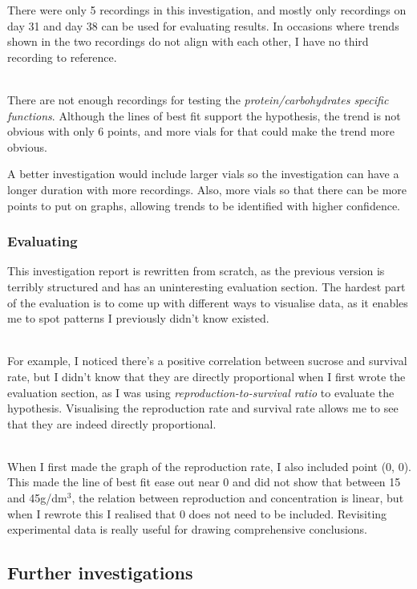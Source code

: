 \documentclass{article}
\begin{document}
There were only 5 recordings in this investigation, and mostly only recordings on day 31 and day 38 can be used for evaluating results. In occasions where trends shown in the two recordings do not align with each other, I have no third recording to reference.

\noindent\\
There are not enough recordings for testing the \emph{protein/carbohydrates specific functions}. Although the lines of best fit support the hypothesis, the trend is not obvious with only 6 points, and more vials for that could make the trend more obvious.

\newpage
\noindent
A better investigation would include larger vials so the investigation can have a longer duration with more recordings. Also, more vials so that there can be more points to put on graphs, allowing trends to be identified with higher confidence.

\subsubsection{Evaluating}

This investigation report is rewritten from scratch, as the previous version is terribly structured and has an uninteresting evaluation section. The hardest part of the evaluation is to come up with different ways to visualise data, as it enables me to spot patterns I previously didn't know existed.

\noindent\\
For example, I noticed there's a positive correlation between sucrose and survival rate, but I didn't know that they are directly proportional when I first wrote the evaluation section, as I was using \emph{reproduction-to-survival ratio} to evaluate the hypothesis. Visualising the reproduction rate and survival rate allows me to see that they are indeed directly proportional.

\noindent\\
When I first made the graph of the reproduction rate, I also included point (0, 0). This made the line of best fit ease out near 0 and did not show that between 15 and 45g/dm$^3$, the relation between reproduction and concentration is linear, but when I rewrote this I realised that 0 does not need to be included. Revisiting experimental data is really useful for drawing comprehensive conclusions.

\subsection{Further investigations}
\end{document}
